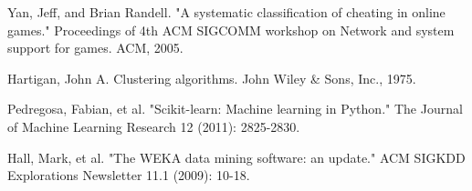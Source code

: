 \begin{thebibliography}{99}
Yan, Jeff, and Brian Randell. "A systematic classification of cheating in online games." Proceedings of 4th ACM SIGCOMM workshop on Network and system support for games. ACM, 2005.

Hartigan, John A. Clustering algorithms. John Wiley \& Sons, Inc., 1975.

Pedregosa, Fabian, et al. "Scikit-learn: Machine learning in Python." The Journal of Machine Learning Research 12 (2011): 2825-2830.

Hall, Mark, et al. "The WEKA data mining software: an update." ACM SIGKDD Explorations Newsletter 11.1 (2009): 10-18.

\end{thebibliography}
